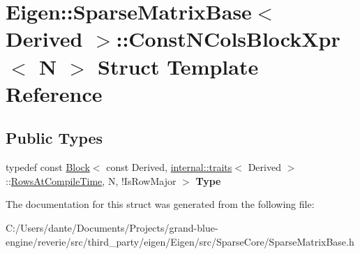 \hypertarget{struct_eigen_1_1_sparse_matrix_base_1_1_const_n_cols_block_xpr}{}\section{Eigen\+::Sparse\+Matrix\+Base$<$ Derived $>$\+::Const\+N\+Cols\+Block\+Xpr$<$ N $>$ Struct Template Reference}
\label{struct_eigen_1_1_sparse_matrix_base_1_1_const_n_cols_block_xpr}
\subsection*{Public Types}
\begin{DoxyCompactItemize}
\item 
\mbox{\label{struct_eigen_1_1_sparse_matrix_base_1_1_const_n_cols_block_xpr_adcb9a3bdd6eae242d2db0093ae24fc09}} 
typedef const \mbox{\hyperlink{class_eigen_1_1_block}{Block}}$<$ const Derived, \mbox{\hyperlink{struct_eigen_1_1internal_1_1traits}{internal\+::traits}}$<$ Derived $>$\+::\mbox{\hyperlink{class_eigen_1_1_sparse_matrix_base_a11b30ed44f64a137b4fa1ee638ca2d36a456cda7b9d938e57194036a41d634604}{Rows\+At\+Compile\+Time}}, N, !Is\+Row\+Major $>$ {\bfseries Type}
\end{DoxyCompactItemize}


The documentation for this struct was generated from the following file\+:\begin{DoxyCompactItemize}
\item 
C\+:/\+Users/dante/\+Documents/\+Projects/grand-\/blue-\/engine/reverie/src/third\+\_\+party/eigen/\+Eigen/src/\+Sparse\+Core/Sparse\+Matrix\+Base.\+h\end{DoxyCompactItemize}
